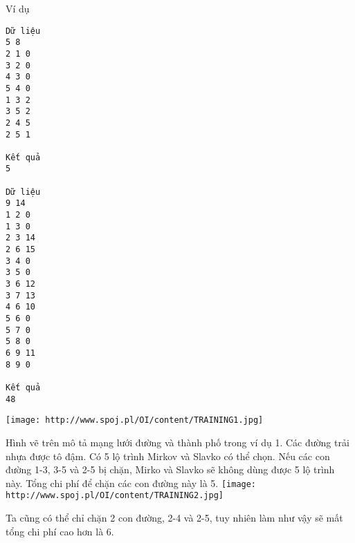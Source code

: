Ví dụ
\begin{verbatim}
Dữ liệu
5 8
2 1 0
3 2 0
4 3 0
5 4 0
1 3 2
3 5 2
2 4 5
2 5 1

Kết quả
5

Dữ liệu
9 14
1 2 0
1 3 0
2 3 14
2 6 15
3 4 0
3 5 0
3 6 12
3 7 13
4 6 10
5 6 0
5 7 0
5 8 0
6 9 11
8 9 0

Kết quả
48
\end{verbatim}
\texttt{[image: http://www.spoj.pl/OI/content/TRAINING1.jpg]}

   Hình vẽ trên mô tả mạng lưới đường và thành phố trong ví dụ 1. Các đường trải nhựa được tô đậm. Có 5 lộ trình Mirkov và Slavko có thể chọn. Nếu các con đường 1-3, 3-5 và 2-5 bị chặn, Mirko và Slavko sẽ không dùng được 5 lộ trình này. Tổng chi phí để chặn các con đường này là 5.  
\texttt{[image: http://www.spoj.pl/OI/content/TRAINING2.jpg]}

   Ta cũng có thể chỉ chặn 2 con đường, 2-4 và 2-5, tuy nhiên làm như vậy sẽ mất tổng chi phí cao hơn là 6.